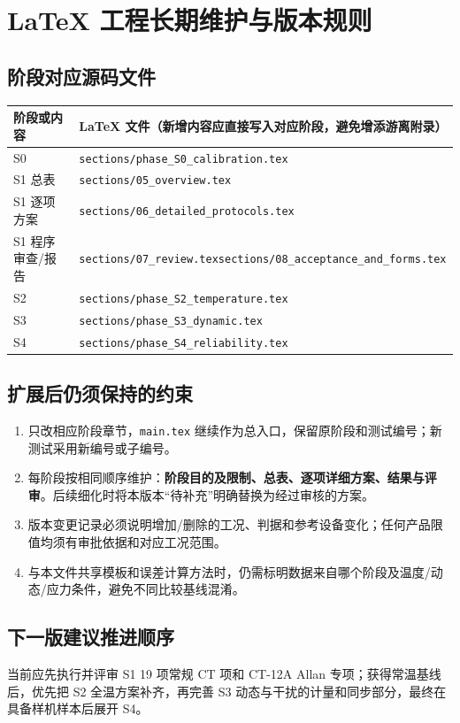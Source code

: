\chapter{LaTeX 工程长期维护与版本规则}
\section{阶段对应源码文件}
\begin{longtable}{p{32mm}p{106mm}}
\toprule 阶段或内容 & LaTeX 文件（新增内容应直接写入对应阶段，避免增添游离附录）\\\midrule\endhead
S0 & \texttt{sections/phase\_S0\_calibration.tex}\\
S1 总表 & \texttt{sections/05\_overview.tex}\\
S1 逐项方案 & \texttt{sections/06\_detailed\_protocols.tex}\\
S1 程序审查/报告 & \texttt{sections/07\_review.tex}\newline\texttt{sections/08\_acceptance\_and\_forms.tex}\\
S2 & \texttt{sections/phase\_S2\_temperature.tex}\\
S3 & \texttt{sections/phase\_S3\_dynamic.tex}\\
S4 & \texttt{sections/phase\_S4\_reliability.tex}\\\bottomrule
\end{longtable}
\section{扩展后仍须保持的约束}
\begin{enumerate}
\item 只改相应阶段章节，\texttt{main.tex} 继续作为总入口，保留原阶段和测试编号；新测试采用新编号或子编号。
\item 每阶段按相同顺序维护：\textbf{阶段目的及限制、总表、逐项详细方案、结果与评审}。后续细化时将本版本“待补充”明确替换为经过审核的方案。
\item 版本变更记录必须说明增加/删除的工况、判据和参考设备变化；任何产品限值均须有审批依据和对应工况范围。
\item 与本文件共享模板和误差计算方法时，仍需标明数据来自哪个阶段及温度/动态/应力条件，避免不同比较基线混淆。
\end{enumerate}
\section{下一版建议推进顺序}
当前应先执行并评审 S1 19 项常规 CT 项和 CT-12A Allan 专项；获得常温基线后，优先把 S2 全温方案补齐，再完善 S3 动态与干扰的计量和同步部分，最终在具备样机样本后展开 S4。
